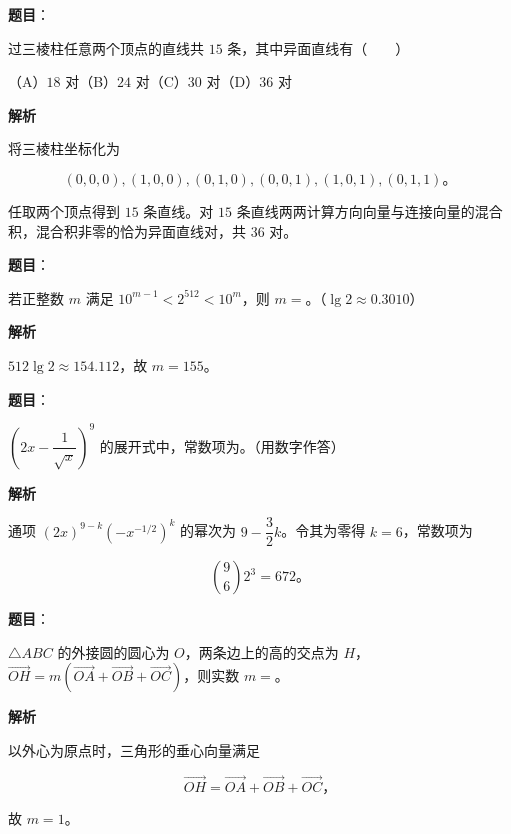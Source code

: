 \begin{answer}

\textbf{题目}：

过三棱柱任意两个顶点的直线共 $15$ 条，其中异面直线有\mbox{（　　）}

（A）$18$ 对\quad（B）$24$ 对\quad（C）$30$ 对\quad（D）$36$ 对

\textbf{解析}

将三棱柱坐标化为

\nopagebreak[4]
\[
(0,0,0),(1,0,0),(0,1,0),(0,0,1),(1,0,1),(0,1,1)\text{。}
\]

任取两个顶点得到 $15$ 条直线。对 $15$ 条直线两两计算方向向量与连接向量的混合积，混合积非零的恰为异面直线对，共 $36$ 对。


\end{answer}
\begin{answer}

\textbf{题目}：

若正整数 $m$ 满足 $10^{m-1}<2^{512}<10^m$，则 $m=$\gkblank{}。（$\lg2\approx0.3010$）

\textbf{解析}

$512\lg2\approx154.112$，故 $m=155$。


\end{answer}
\begin{answer}

\textbf{题目}：

$\left(2x-\dfrac1{\sqrt{x}}\right)^9$ 的展开式中，常数项为\gkblank{}。（用数字作答）

\textbf{解析}

通项 $(2x)^{9-k}(-x^{-1/2})^k$ 的幂次为 $9-\dfrac32k$。令其为零得 $k=6$，常数项为

\nopagebreak[4]
\[
\binom96 2^3=672\text{。}
\]


\end{answer}
\begin{answer}

\textbf{题目}：

$\triangle ABC$ 的外接圆的圆心为 $O$，两条边上的高的交点为 $H$，$\overrightarrow{OH}=m(\overrightarrow{OA}+\overrightarrow{OB}+\overrightarrow{OC})$，则实数 $m=$\gkblank{}。

\textbf{解析}

以外心为原点时，三角形的垂心向量满足

\nopagebreak[4]
\[
\overrightarrow{OH}=\overrightarrow{OA}+\overrightarrow{OB}+\overrightarrow{OC}\text{，}
\]

故 $m=1$。


\end{answer}
